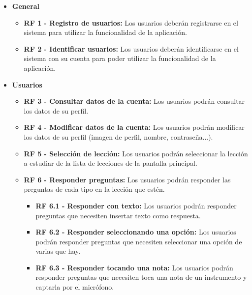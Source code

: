 \begin{itemize}
    \item \textbf{General}
    \begin{itemize}
        \item \textbf{RF 1 - Registro de usuarios: }Los usuarios deberán registrarse en el sistema para utilizar la funcionalidad de la aplicación.
        \item \textbf{RF 2 - Identificar usuarios: }Los usuarios deberán identificarse en el sistema con su cuenta para poder utilizar la funcionalidad de la aplicación.
        
    \end{itemize}
    \item \textbf{Usuarios}
    \begin{itemize}
\item \textbf{RF 3 - Consultar datos de la cuenta: }Los usuarios podrán consultar los datos de su perfil.
        \item \textbf{RF 4 - Modificar datos de la cuenta: }Los usuarios podrán modificar los datos de su perfil (imagen de perfil, nombre, contraseña...).
        \item \textbf{RF 5 - Selección de lección: }Los usuarios podrán seleccionar la lección a estudiar de la lista de lecciones de la pantalla principal. 
        \item \textbf{RF 6 - Responder preguntas: }Los usuarios podrán responder las preguntas de cada tipo en la lección que estén.
            \begin{itemize}
                \item \textbf{RF 6.1 - Responder con texto: }Los usuarios podrán responder preguntas que necesiten insertar texto como respuesta.
                \item \textbf{RF 6.2 - Responder seleccionando una opción: }Los usuarios podrán responder preguntas que necesiten seleccionar una opción de varias que hay.
                \item \textbf{RF 6.3 - Responder tocando una nota: }Los usuarios podrán responder preguntas que necesiten toca una nota de un instrumento y captarla por el micrófono.
            \end{itemize}


\end{itemize}
\end{itemize}
